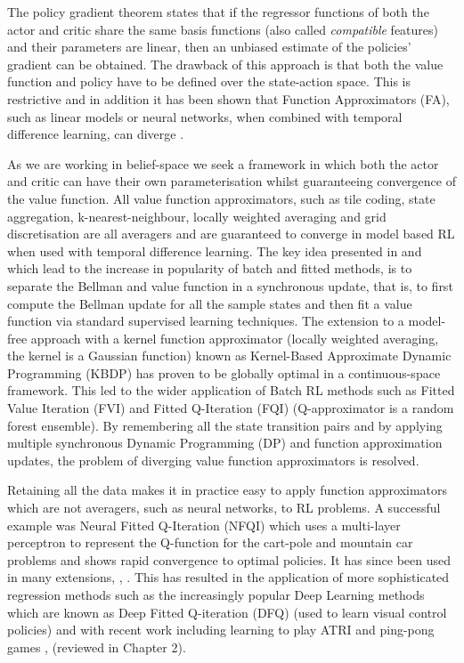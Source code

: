 The policy gradient theorem \citep{Sutton00policygradient} states that if the regressor functions of both the
actor and critic share the same basis functions (also called \textit{compatible} features) and their parameters are linear, 
then an unbiased estimate of the policies' gradient can be obtained. The drawback of this 
approach is that both the value function and policy have to be defined over the state-action space.  
This is restrictive and in addition it has been shown that Function Approximators (FA), such as linear models 
or neural networks, when combined with temporal difference learning, can diverge \citep{Safe_val_function_1995}.

As we are working in belief-space we seek a framework in which both the actor and critic can have 
their own parameterisation whilst guaranteeing convergence of the value function. All value function approximators, 
such as tile coding,  state aggregation, k-nearest-neighbour, locally weighted averaging and grid discretisation 
are all averagers and are guaranteed to converge in model based RL \citep{stable_FA_gordon_1995} when used with 
temporal difference learning. The key idea presented in \cite{stable_FA_gordon_1995} and which lead to the increase in popularity
of batch and fitted methods, is to separate the Bellman and value function in a synchronous update, that 
is, to first compute the Bellman update for all the sample states and then fit a value function via standard supervised 
learning techniques. The extension to a model-free approach with a kernel function approximator (locally weighted averaging, the 
kernel is a Gaussian function) known as Kernel-Based Approximate Dynamic Programming (KBDP) \citep{kernel_rl_ormoneit_2002}
has proven to be globally optimal in a continuous-space framework. This led to the wider application of Batch RL methods 
such as Fitted Value Iteration (FVI) \citep{fvi_uav_2010} and Fitted Q-Iteration (FQI) \citep{EGW05,fqi_nips_peter_2009} (Q-approximator is a random forest ensemble).
By remembering all the state transition pairs and by applying multiple 
synchronous Dynamic Programming (DP) and function approximation updates, the problem of diverging value function approximators is resolved. 

Retaining all the data makes it in practice easy to apply function approximators which are not averagers, such as neural networks,
to RL problems. A successful example was Neural Fitted Q-Iteration (NFQI) \citep{Riedmiller2005} which 
uses a multi-layer perceptron to represent the Q-function for the cart-pole and mountain car problems and 
shows rapid convergence to optimal policies. It has since been used in many extensions, \cite{NAC_2008}, \cite{rl_gmm_2010}.
This has resulted in the application of more sophisticated regression methods such as the increasingly popular Deep Learning methods 
which are known as Deep Fitted Q-iteration (DFQ) \citep{Lange_riedmiller_2010} (used to learn visual control policies) 
and with recent work including learning to play ATRI and ping-pong games \cite{mnih-dqn-2015}, \cite{DRQ_AAAI_2015} (reviewed
in Chapter 2).

